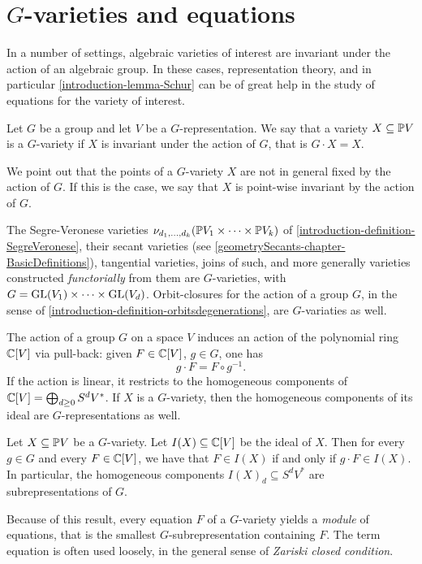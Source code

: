 \section{$G$-varieties and equations}
 \label{repTheory-section-Gvarieties}
In a number of settings, algebraic varieties of interest are invariant under the action of an algebraic group. In these cases, representation theory, and in particular \ref{introduction-lemma-Schur} can be of great help in the study of equations for the variety of interest.

\begin{definition}
 \label{repTheory-definition-Gvariety}
 Let $G$ be a group and let $V$ be a $G$-representation. We say that a variety $X \subseteq \mathbb{P} V$ is a $G$-variety if $X$ is invariant under the action of $G$, that is $G \cdot X = X$. 
\end{definition}
We point out that the points of a $G$-variety $X$ are not in general fixed by the action of $G$. If this is the case, we say that $X$ is point-wise invariant by the action of $G$.

The Segre-Veronese varieties $\nu_{d_1 , \ldots , d_k} ( \mathbb{P} V_1 \times \cdots \times \mathbb{P} V_k)$ of \ref{introduction-definition-SegreVeronese}, their secant varieties (see \ref{geometrySecants-chapter-BasicDefinitions}), tangential varieties, joins of such, and more generally varieties constructed \emph{functorially} from them are $G$-varieties, with $G = \mathrm{GL}(V_1) \times \cdots \times \mathrm{GL}(V_d)$. Orbit-closures for the action of a group $G$, in the sense of \ref{introduction-definition-orbitsdegenerations}, are $G$-variaties as well.

The action of a group $G$ on a space $V$ induces an action of the polynomial ring $\mathbb{C}[V]$ via pull-back: given $F \in \mathbb{C}[V]$, $g \in G$, one has 
\[
g \cdot F = F \circ g^{-1}.
\]
If the action is linear, it restricts to the homogeneous components of $\mathbb{C}[V] = \bigoplus_{d \geq 0} S^d V^*$. If $X$ is a $G$-variety, then the homogeneous components of its ideal are $G$-representations as well.
\begin{lemma}
\label{repTheory-lemma-GactionOnIdeal}
 Let $X \subseteq \mathbb{P} V$ be a $G$-variety. Let $I(X) \subseteq \mathbb{C}[V]$ be the ideal of $X$. Then for every $g \in G$ and every $F \in \mathbb{C}[V]$, we have that $F \in I(X)$ if and only if $g \cdot F \in I(X)$. In particular, the homogeneous components $I(X)_d \subseteq  S^d V^*$ are subrepresentations of $G$.
\end{lemma}
Because of this result, every equation $F$ of a $G$-variety yields a \emph{module} of equations, that is the smallest $G$-subrepresentation containing $F$. The term equation is often used loosely, in the general sense of \emph{Zariski closed condition}.

